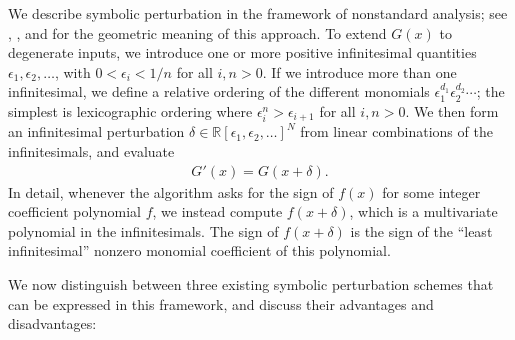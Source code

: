 \documentclass[11pt]{article}
\newcommand{\R}{\mathbb{R}}
\begin{document}
We describe symbolic perturbation in the framework of nonstandard analysis; see \cite{yap1990symbolic}, \cite{emiris1995general},
and \cite{seidel1998nature} for the geometric meaning of this approach.  To extend $G(x)$ to degenerate inputs, we introduce one
or more positive infinitesimal quantities $\epsilon_1, \epsilon_2, \ldots$, with $0 < \epsilon_i < 1/n$ for all $i,n > 0$.  If
we introduce more than one infinitesimal, we define a relative ordering of the different monomials $\epsilon_1^{d_1} \epsilon_2^{d_2} \cdots$;
the simplest is lexicographic ordering where $\epsilon_i^n > \epsilon_{i+1}$ for all $i,n > 0$.
We then form an infinitesimal perturbation $\delta \in \R[\epsilon_1,\epsilon_2, \ldots]^N$ from
linear combinations of the infinitesimals, and evaluate
\begin{align*}
G'(x) = G(x+\delta).
\end{align*}
In detail, whenever the algorithm asks for the sign of $f(x)$ for some integer coefficient polynomial $f$, we instead compute
$f(x+\delta)$, which is a multivariate polynomial in the infinitesimals.  The sign of $f(x+\delta)$ is the sign of the ``least infinitesimal''
nonzero monomial coefficient of this polynomial.

We now distinguish between three existing symbolic perturbation schemes that can be expressed in this framework, and discuss their advantages
and disadvantages:
\end{document}
